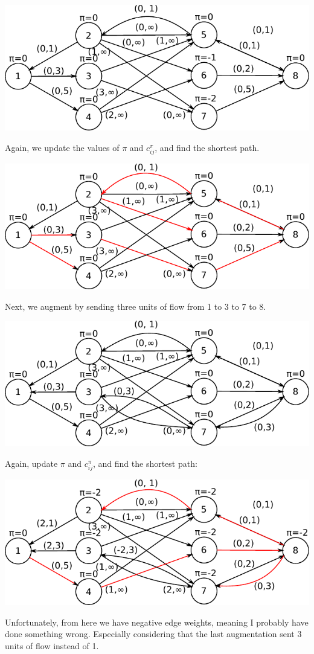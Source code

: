 \documentclass[fleqn]{homework}
\begin{document}
\begin{problem}{5}
    \includegraphics{p5-02-augment.pdf}

    Again, we update the values of $\pi$ and $c_{ij}^\pi$, and find the shortest
    path.

    \includegraphics{p5-03-update-pi.pdf}

    Next, we augment by sending three units of flow from 1 to 3 to 7 to 8.

    \includegraphics{p5-04-augment.pdf}

    Again, update $\pi$ and $c_{ij}^\pi$, and find the shortest path:

    \includegraphics{p5-05-update-pi.pdf}

    Unfortunately, from here we have negative edge weights, meaning I probably
    have done something wrong.  Especially considering that the last
    augmentation sent 3 units of flow instead of 1.
  \end{problem}
\end{document}
